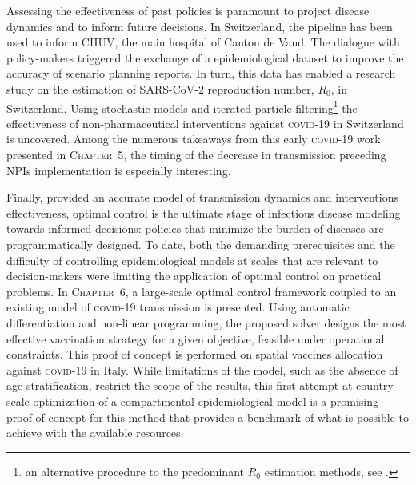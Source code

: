 Assessing the effectiveness of past policies is paramount to project disease dynamics and to inform future decisions. In Switzerland, the pipeline has been used to inform CHUV, the main hospital of Canton de Vaud. The dialogue with policy-makers triggered the exchange of a epidemiological dataset to improve the accuracy of scenario planning reports. In turn, this data has enabled a research study on the estimation of SARS-CoV-2 reproduction number, $R_0$, in Switzerland. Using stochastic models and iterated particle filtering\footnote{an alternative procedure to the predominant $R_0$ estimation methods, see .} the effectiveness of non-pharmaceutical interventions against \textsc{covid-19} in Switzerland is uncovered. Among the numerous takeaways from this early \textsc{covid}-19 work presented in \textsc{Chapter~5}, the timing of the decrease in transmission preceding NPIs implementation is especially interesting. %

Finally, provided an accurate model of transmission dynamics and interventions effectiveness, optimal control is the ultimate stage of infectious disease modeling towards informed decisions: policies that minimize the burden of diseases are programmatically designed. To date, both the demanding prerequisites and the difficulty of controlling epidemiological models at scales that are relevant to decision-makers were limiting the application of optimal control on practical problems. In \textsc{Chapter~6}, a large-scale optimal control framework coupled to an existing model of \textsc{covid}-19 transmission\cite{Gatto:SpreadDynamicsCOVID19:2020,Bertuzzo:GeographyCOVID19Spread:2020} is presented.  Using automatic differentiation and non-linear programming, the proposed solver designs the most effective vaccination strategy for a given objective, feasible under operational constraints. This proof of concept is performed on spatial vaccines allocation against \textsc{covid}-19 in Italy. While limitations of the model, such as the absence of age-stratification, restrict the scope of the results, this first attempt at country scale optimization of a compartmental epidemiological model is a promising proof-of-concept for this method that provides a benchmark of what is possible to achieve with the available resources.%

